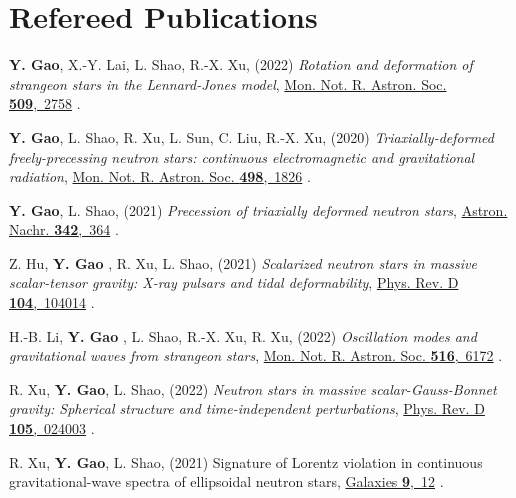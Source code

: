 \section{\sc Refereed Publications}
\begin{etaremune}
\item
  {\bf Y. Gao}, 
  X.-Y. Lai, 
  L. Shao, 
  R.-X. Xu,
  (2022)
  {\it Rotation and deformation of strangeon stars in the Lennard-Jones model}, 
  \href{https://doi.org/10.1093/mnras/stab3181}{Mon. Not. R. Astron. Soc. {\bf 509},~2758}
  .
\item 
  {\bf Y. Gao}, 
  L. Shao, 
  R. Xu, 
  L. Sun, 
  C. Liu, 
  R.-X. Xu,
  (2020) 
  {\it Triaxially-deformed freely-precessing neutron stars: continuous electromagnetic and gravitational radiation}, 
  \href{https://doi.org/10.1093/mnras/staa2476}{Mon. Not. R. Astron. Soc. {\bf 498},~1826}
  .
\item 
  {\bf Y. Gao}, 
  L. Shao,
  (2021) 
  {\it Precession of triaxially deformed neutron stars}, 
  \href{https://doi.org/10.1002/asna.202113935}{Astron. Nachr. {\bf 342},~364}
  .
\item 
  Z. Hu, 
  {\bf Y. Gao },
  R. Xu, 
  L. Shao, 
  (2021)
  {\it Scalarized neutron stars in massive scalar-tensor gravity: X-ray pulsars and tidal deformability}, 
  \href{https://doi.org/10.1103/PhysRevD.104.104014}{Phys. Rev. D {\bf 104},~104014}
  .
\item
  H.-B. Li, 
  {\bf Y. Gao },
  L. Shao, 
  R.-X. Xu, 
  R. Xu, 
  (2022)
  {\it Oscillation modes and gravitational waves from strangeon stars},
  \href{https://academic.oup.com/mnras/advance-article-abstract/doi/10.1093/mnras/stac2622/6705433}{Mon. Not. R. Astron. Soc. {\bf 516},~6172}
  .
\item 
  R. Xu, 
  {\bf Y. Gao}, 
  L. Shao, 
  (2022)
  {\it Neutron stars in massive scalar-Gauss-Bonnet gravity: Spherical structure and time-independent perturbations}, 
  \href{https://doi.org/10.1103/PhysRevD.105.024003}{Phys. Rev. D {\bf 105},~024003}
  .
  \item 
  R. Xu, 
  {\bf Y. Gao}, 
  L. Shao, 
  (2021)
  Signature of Lorentz violation in continuous gravitational-wave spectra of ellipsoidal neutron stars, 
  \href{https://doi.org/10.3390/galaxies9010012}{Galaxies {\bf 9},~12}
  .  
  \setcounter{pubCounter}{\value{enumi}}


\end{etaremune}
